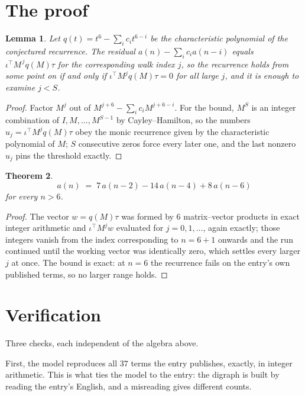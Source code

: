 \documentclass[11pt,a4paper]{article}
\theoremstyle{plain}
\newtheorem{theorem}{Theorem}
\newtheorem{lemma}[theorem]{Lemma}
\theoremstyle{definition}
\begin{document}
\section{The proof}

\begin{lemma}\label{lem:crit}
Let $q(t)=t^{6}-\sum_i c_it^{6-i}$ be the characteristic polynomial of the
conjectured recurrence. The residual $a(n)-\sum_ic_ia(n-i)$ equals
$\iota^{\!\top}M^{\,j}q(M)\tau$ for the corresponding walk index $j$, so the recurrence
holds from some point on if and only if $\iota^{\!\top}M^{j}q(M)\tau=0$ for all large $j$,
and it is enough to examine $j<S$.
\end{lemma}

\begin{proof}
Factor $M^{j}$ out of $M^{j+6}-\sum_ic_iM^{j+6-i}$. For the bound, $M^{S}$
is an integer combination of $I,M,\dots,M^{S-1}$ by Cayley--Hamilton, so the numbers
$u_j=\iota^{\!\top}M^{j}q(M)\tau$ obey the monic recurrence given by the characteristic
polynomial of $M$; $S$ consecutive zeros force every later one, and the last nonzero $u_j$
pins the threshold exactly.
\end{proof}

\begin{theorem}
\[
a(n)\;=\;7\,a(n-2) - 14\,a(n-4) + 8\,a(n-6)
\]
for every $n>6$.
\end{theorem}

\begin{proof}
The vector $w=q(M)\tau$ was formed by $6$ matrix--vector products in exact integer
arithmetic and $\iota^{\!\top}M^{j}w$ evaluated for $j=0,1,\dots$, again exactly; those
integers vanish from the index corresponding to $n=6+1$ onwards and the run continued
until the working vector was identically zero, which settles every larger $j$ at once. The bound is exact: at $n=6$ the recurrence fails on the entry's own published terms, so no larger range holds.
\end{proof}

\section{Verification}

Three checks, each independent of the algebra above.

First, the model reproduces all $37$ terms the entry publishes, exactly, in integer
arithmetic. This is what ties the model to the entry: the digraph is built by reading the
entry's English, and a misreading gives different counts.
\end{document}
